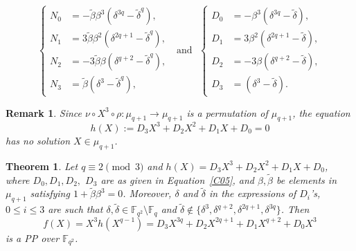 \documentclass[10pt,a4paper]{amsart}
\newtheorem{rmk}{Remark}
\newtheorem{thm}{Theorem}
\newcommand{\F}{\mathbb F}
\begin{document}
 \begin{equation}\label{C05}
  \begin{cases}
   N_0 &= -{\tilde \beta}\beta^3 (\delta^{3q}-{\tilde \delta}^q),\\
   N_1 &= 3{\tilde \beta}\beta^2(\delta^{2q+1}-{\tilde \delta}^q),\\
   N_2 &= -3{\tilde \beta}\beta (\delta^{q+2}-{\tilde \delta}^q),\\
   N_3 &= {\tilde \beta}(\delta^3-{\tilde \delta}^q),
  \end{cases}
  ~~~\mbox{and}~~~
  \begin{cases}
   D_0 &= -\beta^3 (\delta^{3q}-{\tilde \delta}),\\
   D_1 &= 3\beta^2(\delta^{2q+1}-{\tilde \delta}),\\
   D_2 &= -3\beta (\delta^{q+2}-{\tilde \delta}),\\
   D_3 &= (\delta^3-{\tilde \delta}).
  \end{cases}
 \end{equation}

 \begin{rmk}\label{R05}
  Since $ {\nu} \circ X^3 \circ \rho: \mu_{q+1} \rightarrow \mu_{q+1}$ is a permutation of $\mu_{q+1}$, the equation $$h(X):= D_3X^3+D_2X^2+D_1X+D_0 = 0$$
  has no solution $X \in \mu_{q+1}$.
 \end{rmk}

\begin{thm}\label{T05}
Let $q\equiv 2 \pmod 3$ and $h(X)=D_3X^3+D_2X^2 +D_1X+D_0$, where $D_0, D_1, D_2,$ $D_3$ are as given in Equation~\eqref{C05},
and $\beta, {\tilde \beta}$ be elements in $\mu_{q+1}$ satisfying $1+{\tilde \beta}\beta^3=0$. Moreover, $\delta$ and $\tilde \delta$ in the expressions of $D_i$'s, $0 \leq i \leq 3$ are such that $\delta, \tilde \delta \in \F_{q^2}\setminus\F_{q}$ and $\tilde \delta \not \in \{ \delta^3, \delta^{q+2}, \delta^{2q+1}, \delta^{3q}\}$. Then 
$$
f(X)=X^3h(X^{q-1}) = D_3X^{3q}+D_2X^{2q+1} +D_1X^{q+2}+D_0X^3
$$ is a PP over $\F_{q^2}$.

\end{thm}
\end{document}
